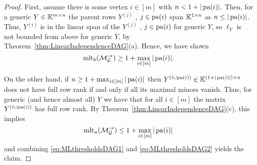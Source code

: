 \begin{proof}
	First, assume there is some vertex $i \in [m]$ with $n < 1+ |\operatorname{pa}(i)|$. Then, for a generic $Y \in \mathbb K^{m \times n}$ the parent rows $Y^{(j)}$ , $j \in \operatorname{pa}(i)$ span $\mathbb K^{1 \times n}$ as $n \leq |\operatorname{pa}(i)|$. Thus, $Y^{(i)}$ is in the linear span of the $Y^{(j)}$ , $j \in \operatorname{pa}(i)$ for generic $Y$, so $\ell_Y$ is not bounded from above for generic $Y$, by Theorem~\ref{thm:LinearIndependenceDAG}(a). Hence, we have shown
		\begin{equation}\label{eq:MLthresholdsDAG1}
			\operatorname{mlt}_b(\mathcal{M}_{\mathcal{G}}^{\to}) \geq  1 + \max_{i \in [m]} |\operatorname{pa}(i)| .
		\end{equation}
	
	On the other hand, if $n \geq  1 + \max_{i \in [m]} |\operatorname{pa}(i)|$ then $Y^{(i \cup \operatorname{pa}(i))} \in \mathbb K^{(1+ |\operatorname{pa}(i)|) \times n}$ does not have full row rank if and only if all its maximal minors vanish. Thus, for generic (and hence almost all) $Y$ we have that for all $i \in [m]$ the matrix $Y^{(i \cup \operatorname{pa}(i))}$ has full row rank. By Theorem~\ref{thm:LinearIndependenceDAG}(c), this implies
		\begin{equation}\label{eq:MLthresholdsDAG2}
			\operatorname{mlt}_u(\mathcal{M}_{\mathcal{G}}^{\to}) \leq  1 + \max_{i \in [m]} |\operatorname{pa}(i)|
		\end{equation}
	and combining \eqref{eq:MLthresholdsDAG1} and \eqref{eq:MLthresholdsDAG2} yields the claim.
\end{proof}









